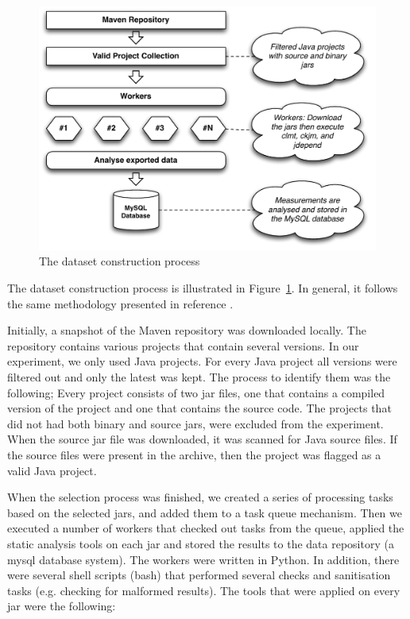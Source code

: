 \documentclass{sig-alternate}
\begin{document}
\begin{figure}
\centering
\includegraphics[scale=0.45]{import-process}
\caption{The dataset construction process}
\label{fig:dataset-construction}
\end{figure}

The dataset construction process is illustrated in Figure~\ref{fig:dataset-construction}. In general, it follows the same methodology presented in reference \cite{MKLGS14}.

Initially, a snapshot of the Maven repository was downloaded locally. The repository contains various projects that contain several versions. In our experiment, we only used Java projects. For every Java project all versions were filtered out and only the latest was kept. The process to identify them was the following; Every project consists of two {\sc jar} files, one that contains a compiled version of the project and one that contains the source code. The projects that did not had both binary and source {\sc jar}s, were excluded from the experiment. When the source {\sc jar} file was downloaded, it was scanned for Java source files. If the source files were present in the archive, then the project was flagged as a valid Java project.

When the selection process was finished, we created a series of processing tasks based on the selected {\sc jar}s, and added them to a task queue mechanism. Then we executed a number of workers that checked out tasks from the queue, applied the static analysis tools on each {\sc jar} and stored the results to the data repository (a {\sc m}y{\sc sql} database system). The workers were written in Python. In addition, there were several shell scripts (bash) that performed several checks and sanitisation tasks (e.g. checking for malformed results). The tools that were applied on every {\sc jar} were the following:
\end{document}
